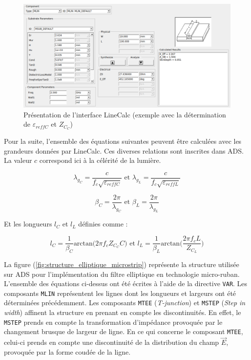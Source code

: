\documentclass[french]{article}
\begin{document}
\begin{figure}[H]
	\centering
	\includegraphics[width=16cm]{../3synthPBas/elliptique/exemple_linecalc.png}
	\caption{Présentation de l'interface LineCalc (exemple avec la détermination de $\varepsilon_{reffC}$ et $Z_{C_C}$)}
	\label{fig:interface_linecalc}
\end{figure}

\newpage

Pour la suite, l'ensemble des équations suivantes peuvent être calculées avec les grandeurs données par LineCalc. Ces diverses relations sont inscrites dans ADS. La valeur $c$ correspond ici à la célérité de la lumière.

\begin{equation}
	\lambda_{g_C}=\frac{c}{f_c \sqrt{\varepsilon_{reffC}}} \mbox{ et } \lambda_{g_L}=\frac{c}{f_c \sqrt{\varepsilon_{reffL}}}
\end{equation}

\begin{equation}
	\beta_C = \frac{2 \pi}{\lambda_{g_C}} \mbox{ et } \beta_L = \frac{2 \pi}{\lambda_{g_L}}
\end{equation}

Et les longueurs $l_C$ et $l_L$ définies comme :

\begin{equation}
	l_C= \frac{1}{\beta_C} \mbox{arctan}\big(2 \pi f_c Z_{C_C} C\big) \mbox{ et } l_L= \frac{1}{\beta_L} \mbox{arctan}\big(\frac{2 \pi f_c L}{Z_{C_L}}\big)
\end{equation}

\vspace{2cm}

La figure (\ref{fig:structure_elliptique_microstrip}) représente la structure utilisée sur ADS pour l'implémentation du filtre elliptique en technologie micro-ruban. L'ensemble des équations ci-dessus ont été écrites à l'aide de la directive \texttt{VAR}. Les composants \texttt{MLIN} représentent les lignes dont les longueurs et largeurs ont été déterminées précédemment. Les composants \texttt{MTEE} (\textit{T-junction}) et \texttt{MSTEP} (\textit{Step in width}) affinent la structure en prenant en compte les discontinuités. En effet, le \texttt{MSTEP} prends en compte la transformation d'impédance provoquée par le changement brusque de largeur de ligne. En ce qui concerne le composant \texttt{MTEE}, celui-ci prends en compte une discontinuité de la distribution du champ $\overrightarrow{E}$, provoquée par la forme coudée de la ligne.
\end{document}
